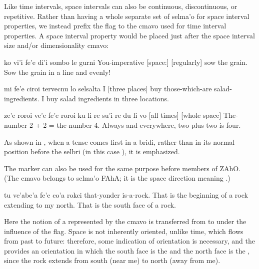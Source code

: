 Like time intervals, space intervals can also be continuous,
    discontinuous, or repetitive. Rather than having a whole
    separate set of selma'o for space interval properties, we
    instead prefix the flag  to the cmavo used for time
    interval properties. A space interval property would be placed
    just after the space interval size and/or dimensionality cmavo:
\begin{example}
ko vi'i fe'e di'i\n
\T	sombo le gurni\n
You-imperative  [space:] [regularly]\n
\T	sow the grain.\n
Sow the grain in a line and evenly!
\end{example}

\begin{example}
mi fe'e ciroi\n
\T	tervecnu lo selsalta\n
I  [three places]\n
\T	buy those-which-are salad-ingredients.\n
I buy salad ingredients in three locations.
\end{example}

\begin{example}
ze'e roroi ve'e\n
\T	fe'e roroi ku\n
\T	li re su'i re du li vo\n
{} [all times] [whole space]\n
{}\n
\T	The-number 2 + 2 = the-number 4.\n
Always and everywhere, two plus two is four.
\end{example}

As shown in , when a tense
    comes first in a bridi, rather than in its normal position
    before the selbri (in this case ), it is emphasized.

The  marker can also be used for the same purpose
    before members of ZAhO. (The cmavo  belongs to selma'o
    FAhA; it is the space direction meaning .)
\begin{example}
tu ve'abe'a\n
\T	fe'e co'a rokci\n
that-yonder \n
\T	[space] [initiative] is-a-rock.\n
That is the beginning of a rock extending to my north.\n
That is the south face of a rock.
\end{example}

Here the notion of a  represented by the
    cmavo  is transferred from  to
     under the influence of the 
    flag. Space is not inherently oriented, unlike time, which
    flows from past to future: therefore, some indication of
    orientation is necessary, and the  provides an
    orientation in which the south face is the  and
    the north face is the , since the rock extends from
    south (near me) to north (away from me). 

